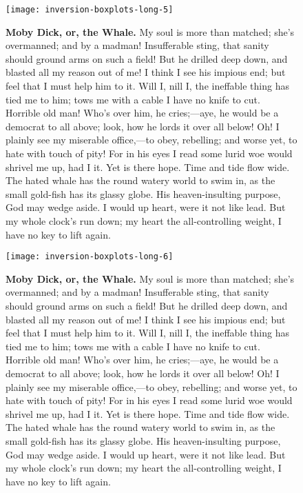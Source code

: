 \documentclass{article}
\begin{document}
\begin{figure}[!htp]
  \begin{center}
      \texttt{[image: inversion-boxplots-long-5]}
    \caption{
        \textbf{Moby Dick, or, the Whale.}
My soul is more than matched; she's overmanned; and by a madman! Insufferable sting, that sanity should ground arms on such a field! But he drilled deep down, and blasted all my reason out of me! I think I see his impious end; but feel that I must help him to it. Will I, nill I, the ineffable thing has tied me to him; tows me with a cable I have no knife to cut. Horrible old man! Who's over him, he cries;—aye, he would be a democrat to all above; look, how he lords it over all below! Oh! I plainly see my miserable office,—to obey, rebelling; and worse yet, to hate with touch of pity! For in his eyes I read some lurid woe would shrivel me up, had I it. Yet is there hope. Time and tide flow wide. The hated whale has the round watery world to swim in, as the small gold-fish has its glassy globe. His heaven-insulting purpose, God may wedge aside. I would up heart, were it not like lead. But my whole clock's run down; my heart the all-controlling weight, I have no key to lift again. 
    }
  \end{center}
\end{figure}

\begin{figure}[!htp]
  \begin{center}
      \texttt{[image: inversion-boxplots-long-6]}
    \caption{
        \textbf{Moby Dick, or, the Whale.}
My soul is more than matched; she's overmanned; and by a madman! Insufferable sting, that sanity should ground arms on such a field! But he drilled deep down, and blasted all my reason out of me! I think I see his impious end; but feel that I must help him to it. Will I, nill I, the ineffable thing has tied me to him; tows me with a cable I have no knife to cut. Horrible old man! Who's over him, he cries;—aye, he would be a democrat to all above; look, how he lords it over all below! Oh! I plainly see my miserable office,—to obey, rebelling; and worse yet, to hate with touch of pity! For in his eyes I read some lurid woe would shrivel me up, had I it. Yet is there hope. Time and tide flow wide. The hated whale has the round watery world to swim in, as the small gold-fish has its glassy globe. His heaven-insulting purpose, God may wedge aside. I would up heart, were it not like lead. But my whole clock's run down; my heart the all-controlling weight, I have no key to lift again. 
    }
  \end{center}
\end{figure}
\end{document}
